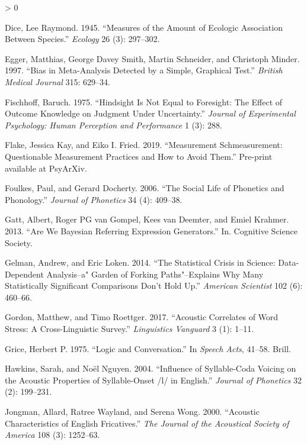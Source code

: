 \documentclass[
  12pt,
]{article}
\newlength{\cslhangindent}
\newenvironment{CSLReferences}[2] %
 {%
  \setlength{\parindent}{0pt}
  \ifodd #1 \everypar{\setlength{\hangindent}{\cslhangindent}}\ignorespaces\fi
  \ifnum #2 > 0
  \setlength{\parskip}{#2\baselineskip}
  \fi
 }%
 {}
\begin{document}
\begin{CSLReferences}{1}{0}
\leavevmode\hypertarget{ref-dice1945}{}%
Dice, Lee Raymond. 1945. {``Measures of the Amount of Ecologic Association Between Species.''} \emph{Ecology} 26 (3): 297--302.

\leavevmode\hypertarget{ref-egger1997}{}%
Egger, Matthias, George Davey Smith, Martin Schneider, and Christoph Minder. 1997. {``Bias in Meta-Analysis Detected by a Simple, Graphical Test.''} \emph{British Medical Journal} 315: 629--34.

\leavevmode\hypertarget{ref-fischhoff1975hindsight}{}%
Fischhoff, Baruch. 1975. {``Hindsight Is Not Equal to Foresight: The Effect of Outcome Knowledge on Judgment Under Uncertainty.''} \emph{Journal of Experimental Psychology: Human Perception and Performance} 1 (3): 288.

\leavevmode\hypertarget{ref-flake2019}{}%
Flake, Jessica Kay, and Eiko I. Fried. 2019. {``Measurement Schmeasurement: Questionable Measurement Practices and How to Avoid Them.''} Pre-print available at PsyArXiv.

\leavevmode\hypertarget{ref-foulkes2006}{}%
Foulkes, Paul, and Gerard Docherty. 2006. {``The Social Life of Phonetics and Phonology.''} \emph{Journal of Phonetics} 34 (4): 409--38.

\leavevmode\hypertarget{ref-gatt2013we}{}%
Gatt, Albert, Roger PG van Gompel, Kees van Deemter, and Emiel Krahmer. 2013. {``Are We Bayesian Referring Expression Generators.''} In. Cognitive Science Society.

\leavevmode\hypertarget{ref-gelman2014statistical}{}%
Gelman, Andrew, and Eric Loken. 2014. {``The Statistical Crisis in Science: Data-Dependent Analysis--a" Garden of Forking Paths"--Explains Why Many Statistically Significant Comparisons Don't Hold Up.''} \emph{American Scientist} 102 (6): 460--66.

\leavevmode\hypertarget{ref-gordon2017acoustic}{}%
Gordon, Matthew, and Timo Roettger. 2017. {``Acoustic Correlates of Word Stress: A Cross-Linguistic Survey.''} \emph{Linguistics Vanguard} 3 (1): 1--11.

\leavevmode\hypertarget{ref-grice1975logic}{}%
Grice, Herbert P. 1975. {``Logic and Conversation.''} In \emph{Speech Acts}, 41--58. Brill.

\leavevmode\hypertarget{ref-hawkins2004influence}{}%
Hawkins, Sarah, and Noël Nguyen. 2004. {``Influence of Syllable-Coda Voicing on the Acoustic Properties of Syllable-Onset /l/ in {E}nglish.''} \emph{Journal of Phonetics} 32 (2): 199--231.

\leavevmode\hypertarget{ref-jongman2000acoustic}{}%
Jongman, Allard, Ratree Wayland, and Serena Wong. 2000. {``Acoustic Characteristics of English Fricatives.''} \emph{The Journal of the Acoustical Society of America} 108 (3): 1252--63.


\end{CSLReferences}
\end{document}
